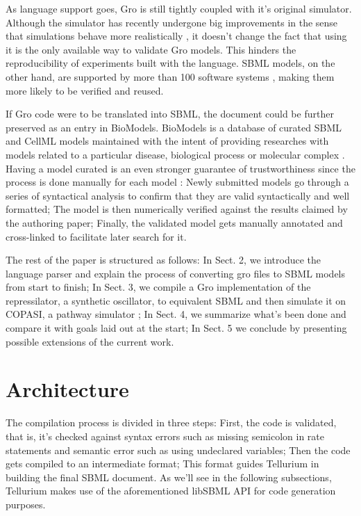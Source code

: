 \documentclass[12pt]{article}
\begin{document}
    As language support goes, Gro is still tightly coupled with it's original simulator. Although the simulator has recently undergone big improvements in the sense that simulations behave more realistically \cite{Gutirrez2017}, it doesn't change the fact that using it is the only available way to validate Gro models. This hinders the reproducibility of experiments built with the language. SBML models, on the other hand, are supported by more than 100 software systems \cite{Hucka2007}, making them more likely to be verified and reused.
    
    If Gro code were to be translated into SBML, the document could be further preserved as an entry in BioModels. BioModels is a database of curated SBML and CellML models maintained with the intent of providing researches with models related to a particular disease, biological process or molecular complex \cite{LeNovere2006}. Having a model curated is an even stronger guarantee of trustworthiness since the process is done manually for each model \cite{LeNovere2006}: Newly submitted models go through a series of syntactical analysis to confirm that they are valid syntactically and well formatted; The model is then numerically verified against the results claimed by the authoring paper; Finally, the validated model gets manually annotated and cross-linked to facilitate later search for it.
    
    The rest of the paper is structured as follows: In Sect. 2, we introduce the language parser and explain the process of converting gro files to SBML models from start to finish; In Sect. 3, we compile a Gro implementation of the repressilator, a synthetic oscillator, to equivalent SBML and then simulate it on COPASI, a pathway simulator \cite{Hoops2006}; In Sect. 4, we summarize what's been done and compare it with goals laid out at the start; In Sect. 5 we conclude by presenting possible extensions of the current work.
    
\section{Architecture}

    
    The compilation process is divided in three steps: First, the code is validated, that is, it's checked against syntax errors such as missing semicolon in rate statements and semantic error such as using undeclared variables; Then the code gets compiled to an intermediate format; This format guides Tellurium in building the final SBML document. As we'll see in the following subsections, Tellurium makes use of the aforementioned libSBML API for code generation purposes.
\end{document}
